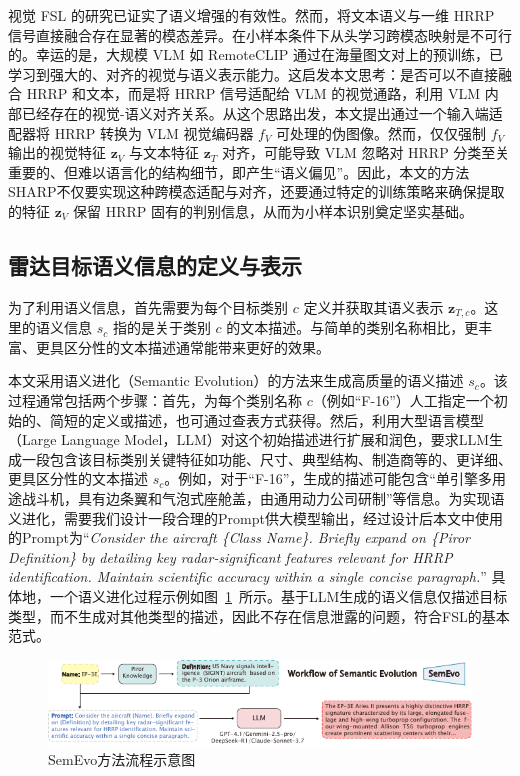 视觉 FSL 的研究已证实了语义增强的有效性。然而，将文本语义与一维 HRRP 信号直接融合存在显著的模态差异。在小样本条件下从头学习跨模态映射是不可行的。幸运的是，大规模 VLM 如 RemoteCLIP 通过在海量图文对上的预训练，已学习到强大的、对齐的视觉与语义表示能力。这启发本文思考：是否可以不直接融合 HRRP 和文本，而是将 HRRP 信号适配给 VLM 的视觉通路，利用 VLM 内部已经存在的视觉-语义对齐关系。从这个思路出发，本文提出通过一个输入端适配器将 HRRP 转换为 VLM 视觉编码器 $f_V$ 可处理的伪图像。然而，仅仅强制 $f_V$ 输出的视觉特征 $\mathbf{z}_V$ 与文本特征 $\mathbf{z}_T$ 对齐，可能导致 VLM 忽略对 HRRP 分类至关重要的、但难以语言化的结构细节，即产生“语义偏见”。因此，本文的方法SHARP不仅要实现这种跨模态适配与对齐，还要通过特定的训练策略来确保提取的特征 $\mathbf{z}_V$ 保留 HRRP 固有的判别信息，从而为小样本识别奠定坚实基础。

\subsection{雷达目标语义信息的定义与表示}
\label{subsec:semantic_representation}

为了利用语义信息，首先需要为每个目标类别 $c$ 定义并获取其语义表示 $\mathbf{z}_{T,c}$。这里的语义信息 $s_c$ 指的是关于类别 $c$ 的文本描述。与简单的类别名称相比，更丰富、更具区分性的文本描述通常能带来更好的效果。

本文采用语义进化（Semantic Evolution）的方法来生成高质量的语义描述 $s_c$。该过程通常包括两个步骤：首先，为每个类别名称 $c$（例如“F-16”）人工指定一个初始的、简短的定义或描述，也可通过查表方式获得。然后，利用大型语言模型（Large Language Model，LLM）对这个初始描述进行扩展和润色，要求LLM生成一段包含该目标类别关键特征如功能、尺寸、典型结构、制造商等的、更详细、更具区分性的文本描述 $s_c$。例如，对于“F-16”，生成的描述可能包含“单引擎多用途战斗机，具有边条翼和气泡式座舱盖，由通用动力公司研制”等信息。为实现语义进化，需要我们设计一段合理的Prompt供大模型输出，经过设计后本文中使用的Prompt为“\textit{Consider the aircraft \{Class Name\}. Briefly expand on \{Piror Definition\} by detailing key radar-significant features relevant for HRRP identification. Maintain scientific accuracy within a single concise paragraph.}” 具体地，一个语义进化过程示例如图~\ref{fig:semevo_framework}~所示。基于LLM生成的语义信息仅描述目标类型，而不生成对其他类型的描述，因此不存在信息泄露的问题，符合FSL的基本范式。

\begin{figure}[h!] \centering %
\includegraphics[width=\linewidth]{figures/semevo.pdf}
\caption{SemEvo方法流程示意图} \label{fig:semevo_framework} %
\end{figure}

